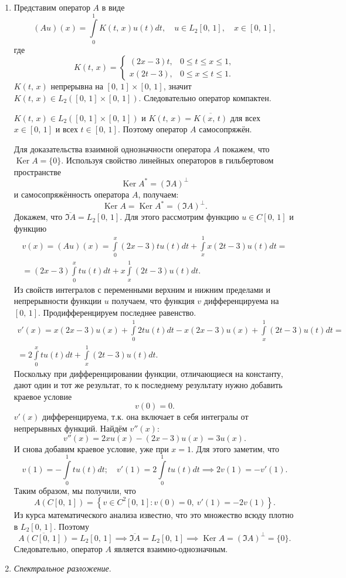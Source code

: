 \documentclass[a4paper]{article}
\begin{document}
\begin{sol}
\begin{enumerate}
\item Представим оператор $A$ в виде
\[
	(Au)(x)= \int\limits_{0}^{1} K(t,\,x)u(t)dt,\quad
	u \in L_2[0,\,1],\quad x \in [0,\,1]
 ,\]
 где
 \[
	 K(t,\,x)= 
	 \begin{cases}
		 (2x-3)t,& 0\le t\le x\le 1,\\
		 x(2t-3),& 0\le x\le t\le 1.
	 \end{cases}
 \]
 $K(t,\,x)$ непрерывна на $[0,\,1]\times[0,\,1]$, значит
 $\displaystyle  K(t,\,x)\in L_2 \left( [0,\,1]\times[0,\,1] \right) $. Следовательно оператор компактен.

 $\displaystyle K(t,\,x) \in L_2\left( [0,\,1]\times[0,\,1] \right) $ и $\displaystyle K(t,\,x)= \overline{K(x,\,t)}$ для всех
 $x \in [0,\,1]$ и всех $t \in [0,\,1]$. Поэтому оператор $A$ 
самосопряжён.

Для доказательства взаимной однозначности оператора $A$ покажем,
что $\operatorname{Ker} A=\{0\} $. Используя свойство
линейных операторов в гильбертовом пространстве
\[
	\operatorname{Ker}A^*= \left( \Im A \right) ^\perp
\]
и самосопряжённость оператора $A$, получаем:
\[
	\operatorname{Ker}A= \operatorname{Ker}A^*= \left( 
	\Im  A\right) ^\perp
.\] 
Докажем, что $\overline{\Im  A}=L_2[0,\,1]$. Для этого рассмотрим
функцию $u \in C[0,\,1]$ и функцию
\begin{multline*}
	v(x)=(Au)(x)= \int\limits_{0}^{x} (2x-3)tu(t)dt+
	\int\limits_{x}^{1}  x(2t-3)u(t) dt=\\=
	(2x-3)\int\limits_{0}^{x}  t u(t)dt+
	x \int\limits_{x}^{1}  (2t-3)u(t)dt
.\end{multline*} 
Из свойств интегралов с переменными верхним и нижним
пределами и непрерывности функции $u$ получаем, что функция
$v$ дифференцируема на $[0,\,1]$. Продифференцируем
последнее равенство.
\begin{multline*}
	v'(x)=x(2x-3)u(x)+\int\limits_{0}^{1} 2 t u(t)dt-
	x(2x-3)u(x)+\int\limits_{x}^{1} (2t-3)u(t)dt=\\=
	2 \int\limits_{0}^{x}  t u(t)dt +
	\int\limits_{x}^{1} (2t-3)u(t)dt 
.\end{multline*} 
Поскольку при дифференцировании функции, отличающиеся на
константу, дают один и тот же результат, то к последнему
результату нужно добавить краевое условие
\[
	v(0)=0
.\] 
$v'(x)$ дифференцируема, т.\:к. она включает в себя интегралы
от непрерывных функций. Найдём $v''(x)$:
\[
	v''(x)=2xu(x)-(2x-3)u(x)=3u(x)
.\] 
И снова добавим краевое условие, уже при $x=1$. Для этого
заметим, что
\[
	v(1)=-\int\limits_{0}^{1} tu(t)dt;\quad
	v'(1)=2 \int\limits_{0}^{1} t u(t) dt\implies
	2v(1)=-v'(1)
.\] 
Таким образом, мы получили, что
\[
	A(C[0,\,1])= \left\{ v \in C^2[0,\,1]\colon 
	v(0)=0,\ v'(1)=-2v(1)\right\} 
.\] 
Из курса математического анализа известно, что это множество
всюду плотно в $L_2[0,\,1]$. Поэтому
\[
	\overline{A(C[0,\,1])}=L_2[0,\,1]\implies
	\overline{\Im A}=L_2[0,\,1]\implies \operatorname{Ker}
	A= \left( \Im  A \right) ^\perp=\{0\} 
.\] 
Следовательно, оператор $A$ является взаимно-однозначным.
\item \emph{Спектральное разложение}.


\end{enumerate}
\end{sol}
\end{document}
